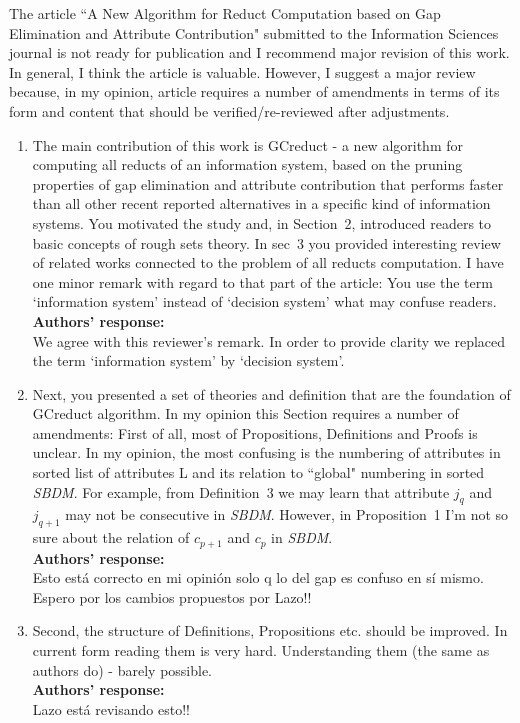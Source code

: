 \documentclass{letter}
\begin{document}
\begin{letter}{}
  The article ``A New Algorithm for Reduct Computation based on Gap Elimination and Attribute Contribution" submitted to the Information Sciences journal is not ready for publication and I recommend major revision of this work. In general, I think the article is valuable. However, I suggest a major review because, in my opinion, article requires a number of amendments in terms of its form and content that should be verified/re-reviewed after adjustments.
 
 \begin{enumerate}  
	\item The main contribution of this work is GCreduct - a new algorithm for computing all reducts of an information system, based on the pruning properties of gap elimination and attribute contribution that performs faster than all other recent reported alternatives in a specific kind of information systems. You motivated the study and, in Section~2, introduced readers to basic concepts of rough sets theory. In sec~3 you provided interesting review of related works connected to the problem of all reducts computation. I have one minor remark with regard to that part of the article: You use the term `information system' instead of `decision system' what may confuse readers.\\
	\textbf{Authors’ response:} \\
	We agree with this reviewer's remark. In order to provide clarity we replaced the term `information system' by `decision system'.
	
	\item Next, you presented a set of theories and definition that are the foundation of GCreduct algorithm. In my opinion this Section requires a number of amendments:
	First of all, most of Propositions, Definitions and Proofs is unclear. In my opinion, the most confusing is the numbering of attributes in sorted list of attributes L and its relation to ``global" numbering in sorted \textit{SBDM}.  For example, from Definition~3 we may learn that attribute $j_{q}$ and $j_{q+1}$ may not be consecutive in \textit{SBDM}. However, in Proposition~1 I'm not so sure about the relation of $c_{p+1}$ and $c_{p}$ in \textit{SBDM}.\\
	\textbf{Authors’ response:}\\
	Esto está correcto en mi opinión solo q lo del gap es confuso en sí mismo. Espero por los cambios propuestos por Lazo!!
	
	\item Second, the structure of  Definitions, Propositions etc. should be improved. In current form reading them is very hard. Understanding them (the same as authors do) - barely possible.\\
	\textbf{Authors’ response:}\\
	Lazo está revisando esto!!
	

\end{enumerate}
\end{letter}
\end{document}
